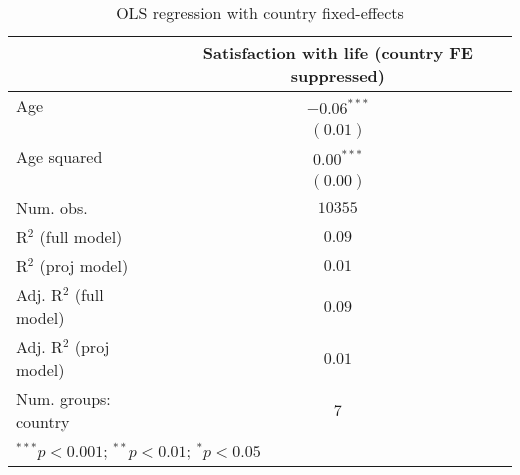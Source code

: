 
\begin{table}
\caption{OLS regression with country fixed-effects}
\begin{center}
\begin{tabular}{l c}
\hline
 & Satisfaction with life (country FE suppressed) \\
\hline
Age                     & $-0.06^{***}$ \\
                        & $(0.01)$      \\
Age squared             & $0.00^{***}$  \\
                        & $(0.00)$      \\
\hline
Num. obs.               & $10355$       \\
R$^2$ (full model)      & $0.09$        \\
R$^2$ (proj model)      & $0.01$        \\
Adj. R$^2$ (full model) & $0.09$        \\
Adj. R$^2$ (proj model) & $0.01$        \\
Num. groups: country    & $7$           \\
\hline
\multicolumn{2}{l}{\scriptsize{$^{***}p<0.001$; $^{**}p<0.01$; $^{*}p<0.05$}}
\end{tabular}
\label{table:coefficients}
\end{center}
\end{table}
